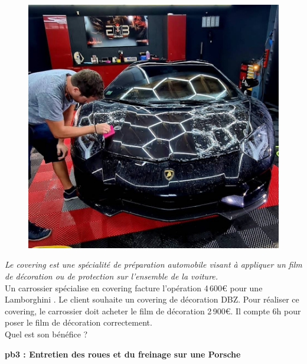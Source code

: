 \begin{multicols}{2} 

\begin{figure}[H]
  \centering
  \includegraphics[width=0.6\linewidth]{5x2-inegalite-triangulaire/lambo.jpg}
\end{figure} \columnbreak

\textit{Le covering est une spécialité de préparation automobile visant à appliquer un film de décoration ou de protection sur l'ensemble de la voiture.} \\

Un carrossier spécialise en covering facture l'opération 4\,600€ pour une Lamborghini . Le client souhaite un covering de décoration DBZ.
Pour réaliser ce covering, le carrossier doit acheter le film de décoration 2\,900€. Il compte 6h pour poser le film de décoration correctement. \\

Quel est son bénéfice ? 

\end{multicols}

\newpage

\textbf{pb3 : Entretien des roues et du freinage sur une Porsche} \\


